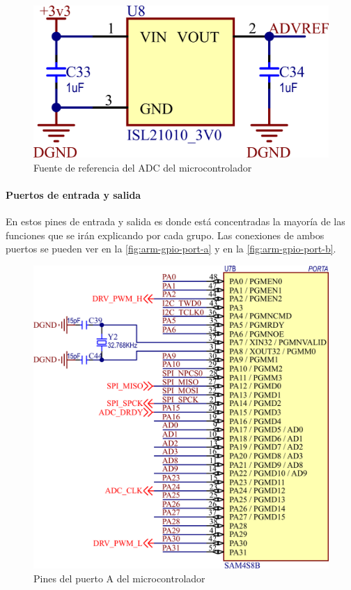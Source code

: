 \documentclass[titlepage, 12pt]{article}
\begin{document}
    \begin{figure}[!htbp]
        \centering
        \includegraphics[scale=1.5]{images/arm-fuente-ref.png}
        \caption{Fuente de referencia del ADC del microcontrolador}
        \label{fig:arm-fuente-ref}
    \end{figure}

\paragraph{Puertos de entrada y salida}
En estos pines de entrada y salida es donde está concentradas la mayoría de las funciones que se irán explicando por cada grupo. Las conexiones de ambos puertos se pueden ver en la \autoref{fig:arm-gpio-port-a} y en la \autoref{fig:arm-gpio-port-b}.


    \begin{figure}[!htbp]
        \centering
        \includegraphics[scale=1.5]{images/arm-gpio-port-a.png}
        \caption{Pines del puerto A del microcontrolador}
        \label{fig:arm-gpio-port-a}
    \end{figure}
\end{document}
